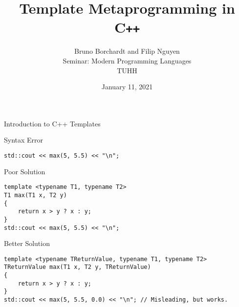 \documentclass{beamer}
\title{Template Metaprogramming in C\texttt{++}}
\author{Bruno Borchardt and Filip Nguyen
\small
\texorpdfstring{\\Seminar: Modern Programming Languages\\TUHH}{}}
\date{January 11, 2021}
\begin{document}

\begin{frame}
\titlepage 
\end{frame}



\begin{frame}[fragile]{Introduction to C++ Templates}

    \scriptsize
    \begin{block}{Syntax Error}
        \begin{verbatim}
std::cout << max(5, 5.5) << "\n";
        \end{verbatim}
    \end{block}

    \begin{block}{Poor Solution}
        \begin{verbatim}
template <typename T1, typename T2>
T1 max(T1 x, T2 y)
{
    return x > y ? x : y;
}
std::cout << max(5, 5.5) << "\n";
        \end{verbatim}
    \end{block}

    \begin{block}{Better Solution}
        \begin{verbatim}
template <typename TReturnValue, typename T1, typename T2>
TReturnValue max(T1 x, T2 y, TReturnValue)
{
    return x > y ? x : y;
}
std::cout << max(5, 5.5, 0.0) << "\n"; // Misleading, but works.
        \end{verbatim}
    \end{block}

\end{frame}



\end{document}
